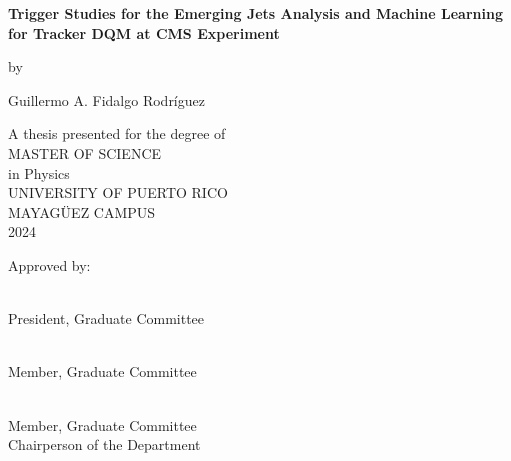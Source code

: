 \begin{titlepage}
    \begin{center}

      {\large
        \textbf{Trigger Studies for the Emerging Jets Analysis and Machine Learning for Tracker DQM at CMS Experiment}
       }

        \normalsize
        \vspace{0.55cm}
        by

        \vspace{0.55cm}

        \large
        Guillermo A. Fidalgo Rodríguez
        \vspace{1cm}

        A thesis presented for the degree of\\
        \vspace{0.5cm}
        MASTER OF SCIENCE \\
        in
        Physics\\
        UNIVERSITY OF PUERTO RICO\\
        MAYAGÜEZ CAMPUS\\
        2024
        \vspace{1.8cm}

        \end{center}

        Approved by:

        \vspace{2.0cm}

\\President, Graduate Committee

\vspace{2.0cm}

\\Member, Graduate Committee

\vspace{2.0cm}

\\Member, Graduate Committee
\\Chairperson of the Department




\end{titlepage}
